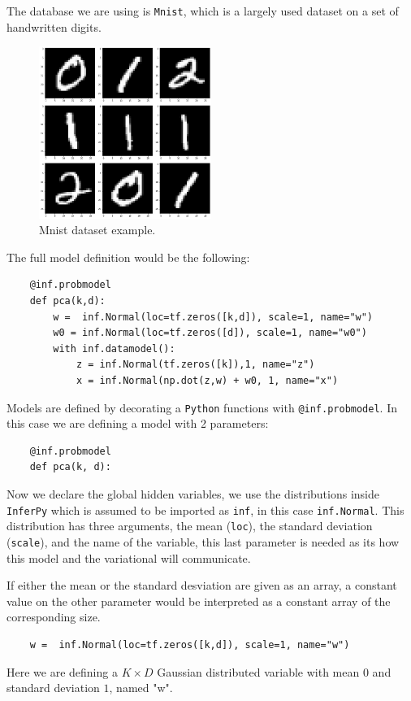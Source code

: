   The database we are using is \texttt{Mnist}, which is a largely used dataset on a set of handwritten digits.

\begin{figure}[h!]
    \centering
    \includegraphics[width=0.5\textwidth]{tex/images/mnist.png}
    \caption{Mnist dataset example.}
\end{figure}

The full model definition would be the following:
\begin{verbatim}
    @inf.probmodel
    def pca(k,d):
        w =  inf.Normal(loc=tf.zeros([k,d]), scale=1, name="w")
        w0 = inf.Normal(loc=tf.zeros([d]), scale=1, name="w0")
        with inf.datamodel():
            z = inf.Normal(tf.zeros([k]),1, name="z")
            x = inf.Normal(np.dot(z,w) + w0, 1, name="x")
\end{verbatim}

Models are defined by decorating a \texttt{Python} functions with \texttt{@inf.probmodel}. In this case we are defining a model with 2 parameters:

\begin{verbatim}
    @inf.probmodel
    def pca(k, d):
\end{verbatim}

Now we declare the global hidden variables, we use the distributions inside \texttt{InferPy} which is assumed to be imported as \texttt{inf}, in this case \texttt{inf.Normal}. This distribution has three arguments, the mean (\texttt{loc}), the standard deviation (\texttt{scale}), and the name of the variable, this last parameter is needed as its how this model and the variational will communicate.

If either the mean or the standard desviation are given as an array, a constant value on the other parameter would be interpreted as a constant array of the corresponding size.
\begin{verbatim}
    w =  inf.Normal(loc=tf.zeros([k,d]), scale=1, name="w")                   
\end{verbatim}
Here we are defining a \( K\times D \)  Gaussian distributed variable with mean \( 0 \) and standard deviation \( 1 \), named "w".

